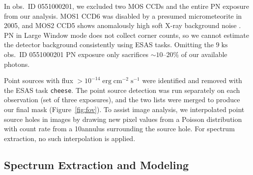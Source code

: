 \documentclass[twocolumn,tighten,trackchanges]{aastex61}
\newcommand*{\mt}{\mathrm}
\newcommand*{\unit}[1]{\;\mt{#1}}  %
\newcommand*{\abt}{\mathord{\sim}} %
\begin{document}
In obs.~ID 0551000201, we excluded two MOS CCDs and the entire PN exposure from
our analysis.
MOS1 CCD6 was disabled by a presumed micrometeorite in 2005, and MOS2 CCD5
shows anomalously high soft X-ray background noise \citep[cf.][]{kuntz2008}.
PN in Large Window mode does not collect corner counts, so we cannot
estimate the detector background consistently using ESAS tasks.
Omitting the $9 \unit{ks}$ obs.~ID 0551000201 PN exposure only sacrifices
$\abt 10$--$20\%$ of our available photons.

Point sources with flux $> 10^{-14} \unit{erg\;cm^{-2}\;s^{-1}}$ were
identified and removed with the ESAS task \texttt{cheese}.
The point source detection was run separately on each observation (set of three
exposures), and the two lists were merged to produce our final mask
(Figure~\ref{fig:fov}).
To assist image analysis, we interpolated point source holes in images by
drawing new pixel values from a Poisson distribution with count rate from a
10\arcsec annulus surrounding the source hole.
For spectrum extraction, no such interpolation is applied.
%

\subsection{Spectrum Extraction and Modeling} \label{sec:spec-extract-fit}
\end{document}
